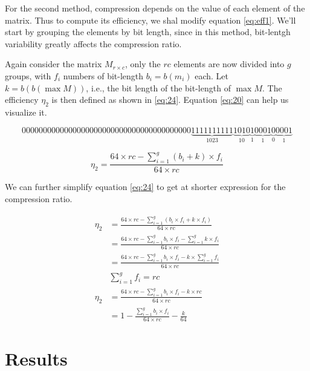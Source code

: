 \documentclass[10pt]{article}
\begin{document}
 For the second method, compression depends on the value of each element of the matrix. Thus to compute its efficiency, we shal modify equation \ref{eq:eff1}. We'll start by grouping the elements by bit length, since in this method, bit-lentgh variability greatly affects the compression ratio.

Again consider the matrix $M_{r \times c}$, only the $rc$ elements are now divided into $g$ groups, with $f_i$ numbers of bit-length $b_i = b(m_i)$ each. Let $k = b(b(\max M))$, i.e., the bit length of the bit-length of $\max M$. The efficiency $\eta_2$ is then defined as shown in \ref{eq:24}. Equation \ref{eq:20} can help us visualize it.

\begin{equation} \label{eq:20}
 0000000000000000000000000000000000000000\underbrace{1111111111}_{1023}\underbrace{1010}_{10}\underbrace{1}_{1}\underbrace{0001}_{1}\underbrace{0}_{0}\underbrace{0001}_{1}
\end{equation}

\begin{equation}\label{eq:24}
 \eta_2 = \frac{64 \times rc - \sum_{i=1}^{g} ( b_i + k ) \times f_i }{64 \times rc} 
\end{equation}

We can further simplify equation \ref{eq:24} to get at shorter expression for the compression ratio.

\begin{align} \label{eq:25}
 \eta_2 &= \frac{64 \times rc - \sum_{i=1}^{g} ( b_i \times f_i + k \times f_i )}{64 \times rc} \nonumber \\
  &= \frac{64 \times rc - \sum_{i=1}^{g}  b_i \times f_i  -\sum_{i=1}^{g}  k \times f_i }{64 \times rc}\nonumber \\
  &= \frac{64 \times rc - \sum_{i=1}^{g}  b_i \times f_i  - k \times\sum_{i=1}^{g}  f_i }{64 \times rc}\nonumber \\
 &\sum_{i=1}^{g} f_i = rc \nonumber \\
 \eta_2 &= \frac{64 \times rc - \sum_{i=1}^{g}  b_i \times f_i  - k \times rc }{64 \times rc}\nonumber \\
  &= 1 - \frac{\sum_{i=1}^{g}  b_i \times f_i }{64 \times rc} - \frac{k}{64}
\end{align}

\section*{Results}
\end{document}
